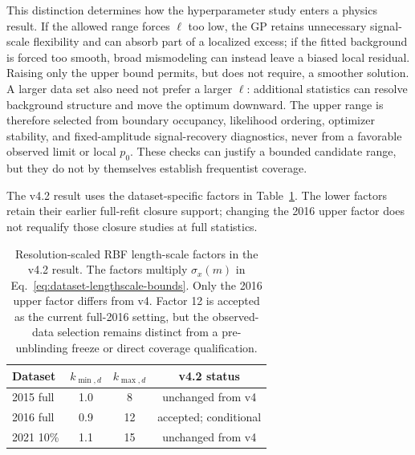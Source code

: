 This distinction determines how the hyperparameter study enters a physics result.
If the allowed range forces $\ell$ too low, the GP retains unnecessary
signal-scale flexibility and can absorb part of a localized excess; if the fitted
background is forced too smooth, broad mismodeling can instead leave a biased local
residual. Raising only the upper bound permits, but does not require, a smoother
solution. A larger data set also need not prefer a larger $\ell$: additional
statistics can resolve background structure and move the optimum downward. The
upper range is therefore selected from boundary occupancy, likelihood ordering,
optimizer stability, and fixed-amplitude signal-recovery diagnostics, never from a
favorable observed limit or local $p_0$. These checks can justify a bounded candidate
range, but they do not by themselves establish frequentist coverage.

The v4.2 result uses the dataset-specific factors in
Table~\ref{tab:production-lengthscale-bounds}. The lower factors retain their earlier
full-refit closure support; changing the 2016 upper factor does not requalify those
closure studies at full statistics.

\begin{table}[H]
\centering
\begin{tabular}{lccc}
\toprule
Dataset & $k_{\min,d}$ & $k_{\max,d}$ & v4.2 status \\
\midrule
2015 full & 1.0 & 8 & unchanged from v4 \\
2016 full & 0.9 & 12 & accepted; conditional \\
2021 10\% & 1.1 & 15 & unchanged from v4 \\
\bottomrule
\end{tabular}
\caption{Resolution-scaled RBF length-scale factors in the v4.2 result. The
factors multiply $\sigma_x(m)$ in
Eq.~\eqref{eq:dataset-lengthscale-bounds}. Only the 2016 upper factor differs from
v4. Factor 12 is accepted as the current full-2016 setting, but the
observed-data selection remains distinct from a pre-unblinding freeze or direct
coverage qualification.}
\label{tab:production-lengthscale-bounds}
\end{table}

